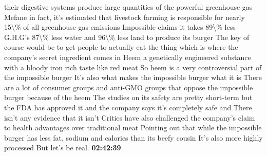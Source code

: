 \documentclass{article}%
\begin{document}
their digestive systems produce large quantities of the powerful greenhouse gas Mefane in fact, it's estimated that livestock farming is responsible for nearly 15\textbackslash{}\% of all greenhouse gas emissions Impossible claims it takes 89\textbackslash{}\% less G.H.G's 87\textbackslash{}\% less water and 96\textbackslash{}\% less land to produce its burger The key of course would be to get people to actually eat the thing which is where the company's secret ingredient comes in Heem a genetically engineered substance with a bloody iron rich taste like red meat So heem is a very controversial part of the impossible burger It's also what makes the impossible burger what it is There are a lot of consumer groups and anti{-}GMO groups that oppose the impossible burger because of the heem The studies on its safety are pretty short{-}term but the FDA has approved it and the company says it's completely safe and There isn't any evidence that it isn't Critics have also challenged the company's claim to health advantages over traditional meat Pointing out that while the impossible burger has less fat, sodium and calories than its beefy cousin It's also more highly processed But let's be real.%
\textbf{02:42:39}%
\newline%
\end{document}
